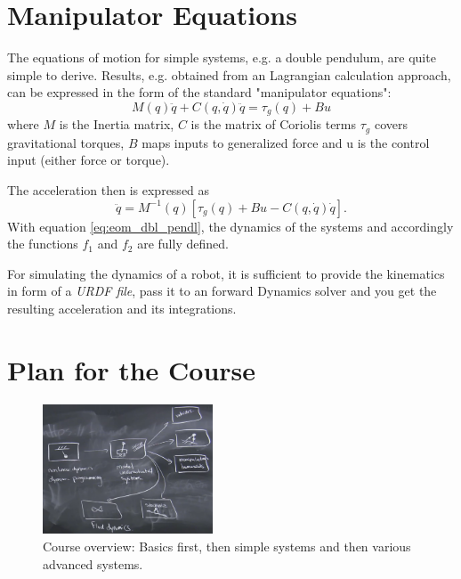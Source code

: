 \documentclass[10pt,english, openany]{book}
\begin{document}
\section{Manipulator Equations}
The equations of motion for simple systems, e.g. a double pendulum, are quite simple to derive. Results, e.g. obtained from an Lagrangian calculation approach, can be expressed in the form of the standard "manipulator equations":
$$M(q)\ddot{q}+C(q,\dot{q})\ddot{q}=\tau_{g}(q)+Bu$$ 
where $M$ is the Inertia matrix, $C$ is the matrix of Coriolis terms $\tau_{g}$ covers gravitational torques, $B$ maps inputs to generalized force and u is the control input (either force or torque).

The acceleration then is expressed as
\begin{equation}\label{eq:eom_dbl_pendl}
\ddot{q}=M^{-1}(q)[\tau_{g}(q)+Bu-C(q,\dot{q})\dot{q}].
\end{equation}
With equation \ref{eq:eom_dbl_pendl}, the dynamics of the systems and accordingly the functions $f_{1}$ and $f_{2}$ are fully defined.

For simulating the dynamics of a robot, it is sufficient to provide the  kinematics in form of a \textit{URDF file}, pass it to an forward Dynamics solver and you get the resulting acceleration and its integrations.


\section{Plan for the Course}

\begin{figure}[h!]
\begin{center}
  \includegraphics[width=0.45\textwidth]{Figures/courseOverview.png}
  \caption{Course overview: Basics first, then simple systems and then various advanced systems.}
  \label{fig:overview}
\end{center}
\end{figure}


\pagebreak





\pagebreak
\end{document}
